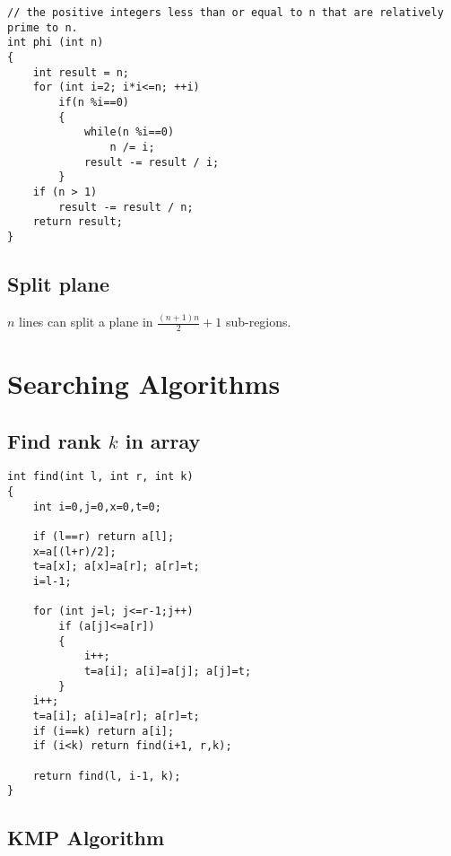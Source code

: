 \documentclass[a4paper]{article}
\begin{document}
\begin{verbatim}
// the positive integers less than or equal to n that are relatively prime to n.
int phi (int n)
{
	int result = n;
	for (int i=2; i*i<=n; ++i)
		if(n %i==0)
		{
			while(n %i==0)
				n /= i;
			result -= result / i;
		}
	if (n > 1)
		result -= result / n;
	return result;
}
\end{verbatim}

\subsection{Split plane}

$n$ lines can split a plane in $\frac{(n+1)n}{2}+1$ sub-regions.

\section{Searching Algorithms}

\subsection{Find rank $k$ in array}

\begin{verbatim}
int find(int l, int r, int k)
{
	int i=0,j=0,x=0,t=0;

	if (l==r) return a[l];
	x=a[(l+r)/2];
	t=a[x]; a[x]=a[r]; a[r]=t;
	i=l-1;

	for (int j=l; j<=r-1;j++)
		if (a[j]<=a[r])
		{
			i++;
			t=a[i]; a[i]=a[j]; a[j]=t;
		}
	i++;
	t=a[i]; a[i]=a[r]; a[r]=t;
	if (i==k) return a[i];
	if (i<k) return find(i+1, r,k);

	return find(l, i-1, k);
}
\end{verbatim}

\subsection{KMP Algorithm}
\end{document}
